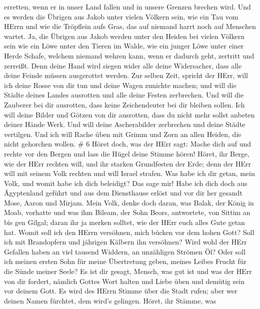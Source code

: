 erretten, wenn er in unser Land fallen und in unsere Grenzen brechen
wird.  Und es werden die Übrigen aus Jakob unter vielen
Völkern sein, wie ein Tau vom HErrn und wie die Tröpflein aufs Gras, das
auf niemand harrt noch auf Menschen wartet.  Ja, die Übrigen
aus Jakob werden unter den Heiden bei vielen Völkern sein wie ein Löwe
unter den Tieren im Walde, wie ein junger Löwe unter einer Herde Schafe,
welchem niemand wehren kann, wenn er dadurch geht, zertritt und
zerreißt.  Denn deine Hand wird siegen wider alle deine
Widersacher, dass alle deine Feinde müssen ausgerottet werden.
 Zur selben Zeit, spricht der HErr, will ich deine Rosse von
dir tun und deine Wagen zunichte machen;  und will die
Städte deines Landes ausrotten und alle deine Festen zerbrechen.
 Und will die Zauberer bei dir ausrotten, dass keine
Zeichendeuter bei dir bleiben sollen.  Ich will deine
Bilder und Götzen von dir ausrotten, dass du nicht mehr sollst anbeten
deiner Hände Werk.  Und will deine Ascherabilder zerbrechen
und deine Städte vertilgen.  Und ich will Rache üben mit
Grimm und Zorn an allen Heiden, die nicht gehorchen wollen. \# 6
 Höret doch, was der HErr sagt: Mache dich auf und rechte
vor den Bergen und lass die Hügel deine Stimme hören! 
Höret, ihr Berge, wie der HErr rechten will, und ihr starken Grundfesten
der Erde; denn der HErr will mit seinem Volk rechten und will Israel
strafen.  Was habe ich dir getan, mein Volk, und womit habe
ich dich beleidigt? Das sage mir!  Habe ich dich doch aus
Ägyptenland geführt und aus dem Diensthause erlöst und vor dir her
gesandt Mose, Aaron und Mirjam.  Mein Volk, denke doch
daran, was Balak, der König in Moab, vorhatte und was ihm Bileam, der
Sohn Beors, antwortete, von Sittim an bis gen Gilgal; daran ihr ja
merken solltet, wie der HErr euch alles Gute getan hat. 
Womit soll ich den HErrn versöhnen, mich bücken vor dem hohen Gott? Soll
ich mit Brandopfern und jährigen Kälbern ihn versöhnen? 
Wird wohl der HErr Gefallen haben an viel tausend Widdern, an unzähligen
Strömen Öl? Oder soll ich meinen ersten Sohn für meine Übertretung
geben, meines Leibes Frucht für die Sünde meiner Seele?  Es
ist dir gesagt, Mensch, was gut ist und was der HErr von dir fordert,
nämlich Gottes Wort halten und Liebe üben und demütig sein vor deinem
Gott.  Es wird des HErrn Stimme über die Stadt rufen; aber
wer deinen Namen fürchtet, dem wird's gelingen. Höret, ihr Stämme, was
